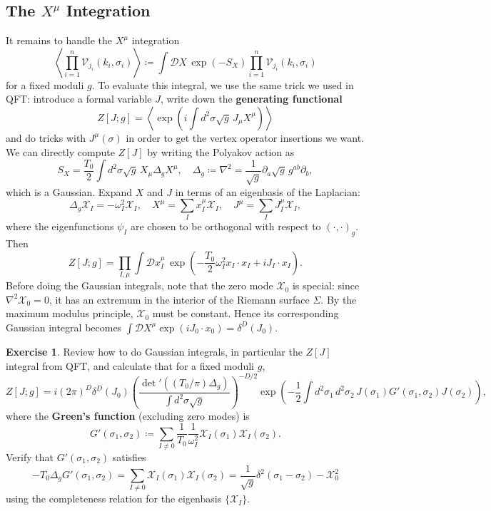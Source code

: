 \documentclass{report}
\theoremstyle{plain}
\theoremstyle{definition}
\newtheorem{exercise}{Exercise}[section]
\theoremstyle{remark}
\newcommand{\di}{\partial}
\newcommand{\cD}{\mathcal{D}}
\newcommand{\cV}{\mathcal{V}}
\newcommand{\cX}{\mathcal{X}}
\begin{document}
\subsection{The $X^\mu$ Integration}

It remains to handle the $X^\mu$ integration
\[ \left\langle \prod_{i=1}^n \cV_{j_i}(k_i, \sigma_i) \right\rangle \coloneqq \int \cD X \, \exp(-S_X) \prod_{i=1}^n \cV_{j_i}(k_i, \sigma_i) \]
for a fixed moduli $g$. To evaluate this integral, we use the same
trick we used in QFT: introduce a formal variable $J$, write down the
{\bf generating functional}
\[ Z[J; g] = \left\langle \exp\left(i\int d^2\sigma \sqrt{g} \, J_\mu X^\mu\right) \right\rangle \]
and do tricks with $J^\mu(\sigma)$ in order to get the vertex operator
insertions we want. We can directly compute $Z[J]$ by writing the
Polyakov action as
\[ S_X = \frac{T_0}{2} \int d^2\sigma \sqrt{g} \, X_\mu \Delta_g X^\mu, \quad \Delta_g \coloneqq \nabla^2 = \frac{1}{\sqrt{g}} \di_a \sqrt{g} \, g^{ab} \di_b, \]
which is a Gaussian. Expand $X$ and $J$ in terms of an eigenbasis of
the Laplacian:
\[ \Delta_g \cX_I = -\omega_I^2 \cX_I, \quad X^\mu = \sum_I x_I^\mu \cX_I, \quad J^\mu = \sum_I J_I^\mu \cX_I, \]
where the eigenfunctions $\psi_I$ are chosen to be orthogonal with
respect to $(\cdot, \cdot)_g$. Then
\[ Z[J; g] = \prod_{I,\mu} \int \cD x^\mu_I \, \exp\left(-\frac{T_0}{2} \omega_I^2 x_I \cdot x_I + iJ_I \cdot x_I\right). \]
Before doing the Gaussian integrals, note that the zero mode $\cX_0$
is special: since $\nabla^2 \cX_0 = 0$, it has an extremum in the
interior of the Riemann surface $\Sigma$. By the maximum modulus
principle, $\cX_0$ must be constant. Hence its corresponding Gaussian
integral becomes $\int \cD X^\mu \exp(iJ_0 \cdot x_0) =
\delta^D(J_0)$.

\begin{exercise}
  Review how to do Gaussian integrals, in particular the $Z[J]$
  integral from QFT, and calculate that for a fixed moduli $g$,
  \[ Z[J; g] = i(2\pi)^D \delta^D(J_0) \left(\frac{\det\nolimits' ((T_0/\pi)\Delta_g)}{\int d^2\sigma \sqrt{g}}\right)^{-D/2} \exp\left(-\frac{1}{2} \int d^2 \sigma_1 \, d^2\sigma_2 \, J(\sigma_1) G'(\sigma_1, \sigma_2) J(\sigma_2)\right), \]
  where the {\bf Green's function} (excluding zero modes) is
  \[ G'(\sigma_1, \sigma_2) \coloneqq \sum_{I \neq 0} \frac{1}{T_0} \frac{1}{\omega_I^2} \cX_I(\sigma_1) \cX_I(\sigma_2). \]
  Verify that $G'(\sigma_1, \sigma_2)$ satisfies
  \[ -T_0 \Delta_g G'(\sigma_1, \sigma_2) = \sum_{I \neq 0} \cX_I(\sigma_1) \cX_I(\sigma_2) = \frac{1}{\sqrt{g}} \delta^2(\sigma_1 - \sigma_2) - \cX_0^2 \]
  using the completeness relation for the eigenbasis $\{\cX_I\}$.
\end{exercise}
\end{document}
